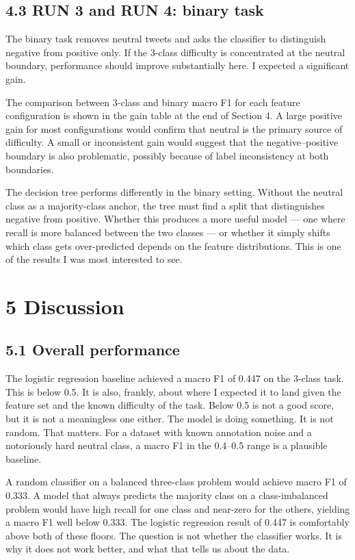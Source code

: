 \documentclass[12pt]{article}
\begin{document}
\subsection*{4.3 RUN 3 and RUN 4: binary task}

The binary task removes neutral tweets and asks the classifier to distinguish negative from positive only. If the 3-class difficulty is concentrated at the neutral boundary, performance should improve substantially here. I expected a significant gain.

The comparison between 3-class and binary macro F1 for each feature configuration is shown in the gain table at the end of Section 4. A large positive gain for most configurations would confirm that neutral is the primary source of difficulty. A small or inconsistent gain would suggest that the negative--positive boundary is also problematic, possibly because of label inconsistency at both boundaries.

The decision tree performs differently in the binary setting. Without the neutral class as a majority-class anchor, the tree must find a split that distinguishes negative from positive. Whether this produces a more useful model --- one where recall is more balanced between the two classes --- or whether it simply shifts which class gets over-predicted depends on the feature distributions. This is one of the results I was most interested to see.

\section*{5 Discussion}

\subsection*{5.1 Overall performance}

The logistic regression baseline achieved a macro F1 of 0.447 on the 3-class task. This is below 0.5. It is also, frankly, about where I expected it to land given the feature set and the known difficulty of the task. Below 0.5 is not a good score, but it is not a meaningless one either. The model is doing something. It is not random. That matters. For a dataset with known annotation noise and a notoriously hard neutral class, a macro F1 in the 0.4--0.5 range is a plausible baseline.

A random classifier on a balanced three-class problem would achieve macro F1 of 0.333. A model that always predicts the majority class on a class-imbalanced problem would have high recall for one class and near-zero for the others, yielding a macro F1 well below 0.333. The logistic regression result of 0.447 is comfortably above both of these floors. The question is not whether the classifier works. It is why it does not work better, and what that tells us about the data.
\end{document}
